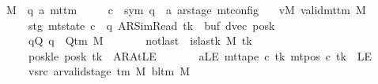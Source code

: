 \begin{isabellebody}
\ \ \ M\ {\isacharcolon}{\kern0pt}{\isacharcolon}{\kern0pt}\ {\isachardoublequoteopen}{\isacharparenleft}{\kern0pt}{\isacharprime}{\kern0pt}q{\isacharcomma}{\kern0pt}\ {\isacharprime}{\kern0pt}a{\isacharparenright}{\kern0pt}\ mttm{\isachardoublequoteclose}\isanewline
\ \ \ \ \ c{\isacharprime}{\kern0pt}\ {\isacharcolon}{\kern0pt}{\isacharcolon}{\kern0pt}\ {\isachardoublequoteopen}{\isacharparenleft}{\kern0pt}sym{}{\isacharcomma}{\kern0pt}\ {\isacharprime}{\kern0pt}q\ {\isasymtimes}\ {\isacharprime}{\kern0pt}a\ ar{\isacharunderscore}{\kern0pt}stage{\isacharparenright}{\kern0pt}\ mt{\isacharunderscore}{\kern0pt}config{\isachardoublequoteclose}\isanewline
\ \ \ vM{\isacharcolon}{\kern0pt}\ {\isachardoublequoteopen}valid{\isacharunderscore}{\kern0pt}mttm\ M{\isachardoublequoteclose}\isanewline
\ \ \ \ \ \ \ stg{\isacharcolon}{\kern0pt}\ {\isachardoublequoteopen}mt{\isacharunderscore}{\kern0pt}state\ c{\isacharprime}{\kern0pt}\ {\isacharequal}{\kern0pt}\ {\isacharparenleft}{\kern0pt}q{\isacharcomma}{\kern0pt}\ AR{\isacharunderscore}{\kern0pt}SimRead{\isacharcomma}{\kern0pt}\ tk{\isacharcomma}{\kern0pt}\ {}{\isacharcomma}{\kern0pt}\ buf{\isacharcomma}{\kern0pt}\ dvec{\isacharcomma}{\kern0pt}\ posk{\isacharparenright}{\kern0pt}{\isachardoublequoteclose}\isanewline
\ \ \ \ \ \ \ qQ{\isacharcolon}{\kern0pt}\ {\isachardoublequoteopen}q\ {\isasymin}\ Q{\isacharunderscore}{\kern0pt}tm\ M{\isachardoublequoteclose}\isanewline
\ \ \ \ \ \ \ notlast{\isacharcolon}{\kern0pt}\ {\isachardoublequoteopen}{\isasymnot}\ is{\isacharunderscore}{\kern0pt}last{\isacharunderscore}{\kern0pt}k\ M\ tk{\isachardoublequoteclose}\isanewline
\ \ \ \ \ \ \ posk{\isacharunderscore}{\kern0pt}le{\isacharcolon}{\kern0pt}\ {\isachardoublequoteopen}posk\ tk\ {\isacharequal}{\kern0pt}\ AR{\isacharunderscore}{\kern0pt}AtLE{\isachardoublequoteclose}\isanewline
\ \ \ \ \ \ \ aLE{\isacharcolon}{\kern0pt}\ {\isachardoublequoteopen}mt{\isacharunderscore}{\kern0pt}tape\ c{\isacharprime}{\kern0pt}\ tk\ {\isacharparenleft}{\kern0pt}mt{\isacharunderscore}{\kern0pt}pos\ c{\isacharprime}{\kern0pt}\ tk{\isacharparenright}{\kern0pt}\ {\isacharequal}{\kern0pt}\ LE{}{\isachardoublequoteclose}\isanewline
\ \ \ \ \ \ \ vsrc{\isacharcolon}{\kern0pt}\ {\isachardoublequoteopen}ar{\isacharunderscore}{\kern0pt}valid{\isacharunderscore}{\kern0pt}stage\ {\isacharparenleft}{\kern0pt}{\isasymGamma}{\isacharunderscore}{\kern0pt}tm\ M{\isacharparenright}{\kern0pt}\ {\isacharparenleft}{\kern0pt}bl{\isacharunderscore}{\kern0pt}tm\ M{\isacharparenright}{\kern0pt}\isanewline

\end{isabellebody}
